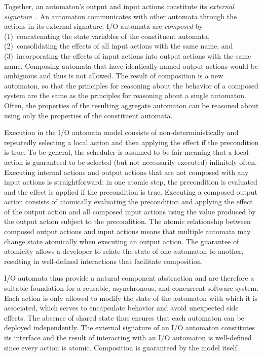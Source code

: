 Together, an automaton's output and input actions constitute its \emph{external signature}~\cite{lynch1996distributed}.
An automaton communicates with other automata through the actions in its external signature.
I/O automata are \emph{composed} by (1)~concatenating the state variables of the constituent automata, (2)~consolidating the effects of all input actions with the same name, and (3)~incorporating the effects of input actions into output actions with the same name.
Composing automata that have identically named output actions would be ambiguous and thus is not allowed.
The result of composition is a new automaton, so that the principles for reasoning about the behavior of a composed system are the same as the principles for reasoning about a single automaton.
Often, the properties of the resulting aggregate automaton can be reasoned about using only the properties of the constituent automata.

Execution in the I/O automata model consists of non-deterministically and repeatedly selecting a local action and then applying the effect if the precondition is true.
To be general, the scheduler is assumed to be fair meaning that a local action is guaranteed to be selected (but not necessarily executed) infinitely often.
Executing internal actions and output actions that are not composed with any input actions is straightforward: in one atomic step, the precondition is evaluated and the effect is applied if the precondition is true.
Executing a composed output action consists of atomically evaluating the precondition and applying the effect of the output action and all composed input actions using the value produced by the output action subject to the precondition.
The atomic relationship between composed output actions and input actions means that multiple automata may change state atomically when executing an output action.
The guarantee of atomicity allows a developer to relate the state of one automaton to another, resulting in well-defined interactions that facilitate composition.

I/O automata thus provide a natural component abstraction and are therefore a suitable foundation for a reusable, asynchronous, and concurrent software system.
Each action is only allowed to modify the state of the automaton with which it is associated, which serves to encapsulate behavior and avoid unexpected side effects.
The absence of shared state thus ensures that each automaton can be deployed independently.
The external signature of an I/O automaton constitutes its interface and the result of interacting with an I/O automaton is well-defined since every action is atomic.
Composition is guaranteed by the model itself.

